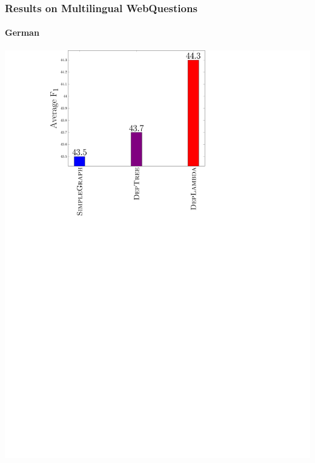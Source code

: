 \documentclass[mathserif,12pt]{beamer}
\begin{document}
\begin{frame}
\frametitle{Results on Multilingual WebQuestions}
\framesubtitle{German}
\centering
\large
\vspace{0.4em}
\includegraphics[trim=9.5em 0em 23em 0.5em,clip=true,scale=0.5]{figures/deplambda_results_plot_ud-de}
\end{frame}
\end{document}
